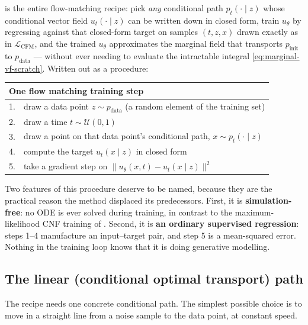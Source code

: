 \documentclass[11pt,a4paper]{report}
\theoremstyle{definition}
\theoremstyle{remark}
\begin{document}
 is the entire flow-matching recipe: pick
\emph{any} conditional path $p_t(\cdot\mid z)$ whose conditional vector
field $u_t(\cdot\mid z)$ can be written down in closed form, train
$u_\theta$ by regressing against that closed-form target on samples
$(t,z,x)$ drawn exactly as in $\mathcal L_{\mathrm{CFM}}$, and the trained
$u_\theta$ approximates the marginal field that transports
$p_{\mathrm{init}}$ to $p_{\mathrm{data}}$ --- without ever needing to
evaluate the intractable integral \eqref{eq:marginal-vf-scratch}. Written
out as a procedure:

\begin{center}
\begin{tabular}{rp{11.5cm}}
\toprule
\multicolumn{2}{l}{\textbf{One flow matching training step}} \\
\midrule
1. & draw a data point $z\sim p_{\mathrm{data}}$ (a random element of the training set) \\
2. & draw a time $t\sim\mathcal U(0,1)$ \\
3. & draw a point on that data point's conditional path, $x\sim p_t(\cdot\mid z)$ \\
4. & compute the target $u_t(x\mid z)$ in closed form \\
5. & take a gradient step on $\bigl\|u_\theta(x,t)-u_t(x\mid z)\bigr\|^2$ \\
\bottomrule
\end{tabular}
\end{center}

Two features of this procedure deserve to be named, because they are the
practical reason the method displaced its predecessors. First, it is
\textbf{simulation-free}: no ODE is ever solved during training, in
contrast to the maximum-likelihood CNF training of .
Second, it is \textbf{an ordinary supervised regression}: steps 1--4
manufacture an input--target pair, and step 5 is a mean-squared error.
Nothing in the training loop knows that it is doing generative modelling.

\subsection{The linear (conditional optimal transport) path}
\label{sec:linear-path-scratch}

The recipe needs one concrete conditional path. The simplest possible
choice is to move in a straight line from a noise sample to the data point,
at constant speed.
\end{document}
